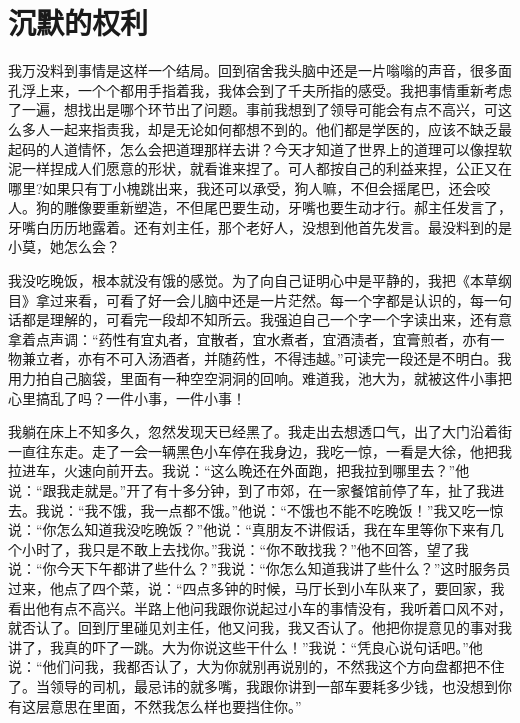 \documentclass[12pt,oneside]{book}
\begin{document}
\chapter{沉默的权利}

我万没料到事情是这样一个结局。回到宿舍我头脑中还是一片嗡嗡的声音，很多面孔浮上来，一个个都用手指着我，我体会到了千夫所指的感受。我把事情重新考虑了一遍，想找出是哪个环节出了问题。事前我想到了领导可能会有点不高兴，可这么多人一起来指责我，却是无论如何都想不到的。他们都是学医的，应该不缺乏最起码的人道情怀，怎么会把道理那样去讲？今天才知道了世界上的道理可以像捏软泥一样捏成人们愿意的形状，就看谁来捏了。可人都按自己的利益来捏，公正又在哪里?如果只有丁小槐跳出来，我还可以承受，狗人嘛，不但会摇尾巴，还会咬人。狗的雕像要重新塑造，不但尾巴要生动，牙嘴也要生动才行。郝主任发言了，牙嘴白历历地露着。还有刘主任，那个老好人，没想到他首先发言。最没料到的是小莫，她怎么会？

我没吃晚饭，根本就没有饿的感觉。为了向自己证明心中是平静的，我把《本草纲目》拿过来看，可看了好一会儿脑中还是一片茫然。每一个字都是认识的，每一句话都是理解的，可看完一段却不知所云。我强迫自己一个字一个字读出来，还有意拿着点声调：``药性有宜丸者，宜散者，宜水煮者，宜酒渍者，宜膏煎者，亦有一物兼立者，亦有不可入汤酒者，并随药性，不得违越。''可读完一段还是不明白。我用力拍自己脑袋，里面有一种空空洞洞的回响。难道我，池大为，就被这件小事把心里搞乱了吗？一件小事，一件小事！

我躺在床上不知多久，忽然发现天已经黑了。我走出去想透口气，出了大门沿着街一直往东走。走了一会一辆黑色小车停在我身边，我吃一惊，一看是大徐，他把我拉进车，火速向前开去。我说：``这么晚还在外面跑，把我拉到哪里去？''他说：``跟我走就是。''开了有十多分钟，到了市郊，在一家餐馆前停了车，扯了我进去。我说：``我不饿，我一点都不饿。''他说：``不饿也不能不吃晚饭！''我又吃一惊说：``你怎么知道我没吃晚饭？''他说：``真朋友不讲假话，我在车里等你下来有几个小时了，我只是不敢上去找你。''我说：``你不敢找我？''他不回答，望了我说：``你今天下午都讲了些什么？''我说：``你怎么知道我讲了些什么？''这时服务员过来，他点了四个菜，说：``四点多钟的时候，马厅长到小车队来了，要回家，我看出他有点不高兴。半路上他问我跟你说起过小车的事情没有，我听着口风不对，就否认了。回到厅里碰见刘主任，他又问我，我又否认了。他把你提意见的事对我讲了，我真的吓了一跳。大为你说这些干什么！''我说：``凭良心说句话吧。''他说：``他们问我，我都否认了，大为你就别再说别的，不然我这个方向盘都把不住了。当领导的司机，最忌讳的就多嘴，我跟你讲到一部车要耗多少钱，也没想到你有这层意思在里面，不然我怎么样也要挡住你。''
\end{document}
